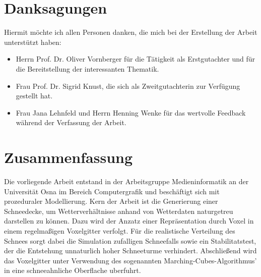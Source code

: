 \section{Danksagungen}

Hiermit möchte ich allen Personen danken, die mich bei der Erstellung der Arbeit
unterstützt haben:

\begin{itemize}
\item Herrn Prof. Dr. Oliver Vornberger für die Tätigkeit als Erstgutachter und
für die Bereitstellung der interessanten Thematik.
\item Frau Prof. Dr. Sigrid Knust, die sich als Zweitgutachterin zur Verfügung gestellt hat.
\item Frau Jana Lehnfeld und Herrn Henning Wenke für das wertvolle Feedback
während der Verfassung der Arbeit.
\end{itemize}

\section{Zusammenfassung}

Die vorliegende Arbeit entstand in der Arbeitsgruppe Medieninformatik an der Universität Osna
im Bereich Computergrafik und beschäftigt sich mit prozeduraler Modellierung. Kern
der Arbeit ist die Generierung einer Schneedecke, um Wetterverhältnisse anhand
von Wetterdaten naturgetreu darstellen zu können. Dazu wird der Anzatz einer
Repräsentation durch Voxel in einem regelmaßigen Voxelgitter verfolgt. Für die
realistische Verteilung des Schnees sorgt dabei die Simulation zufalligen
Schneefalls sowie ein Stabilitatstest, der die Entstehung unnaturlich hoher
Schneeturme verhindert. Abschließend wird das Voxelgitter unter Verwendung des
sogenannten Marching-Cubes-Algorithmus' in eine schneeahnliche Oberflache
uberfuhrt.
